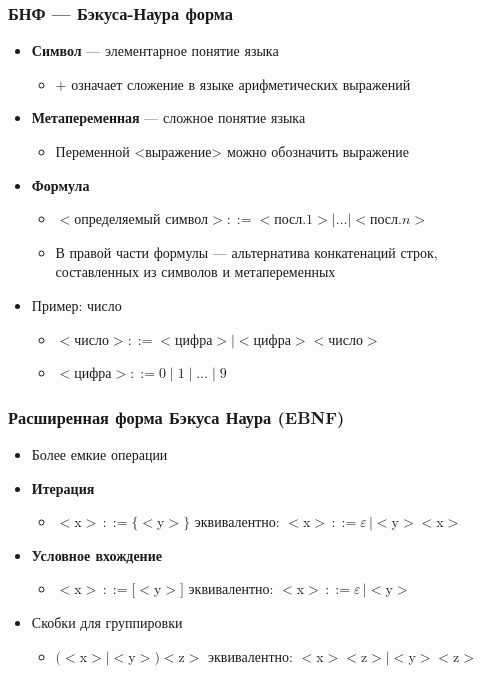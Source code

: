 \documentclass{beamer}
\begin{document}
\begin{frame}[fragile]
  \transwipe[direction=90]
  \frametitle{БНФ ---  Бэкуса-Наура форма}
  \begin{itemize}
    \item \textbf{Символ} --- элементарное понятие языка
    \begin{itemize}
      \item $+$ означает сложение в языке арифметических выражений
    \end{itemize}
    \item \textbf{Метапеременная} --- сложное понятие языка
    \begin{itemize}
      \item Переменной <выражение> можно обозначить выражение
    \end{itemize}
    \item \textbf{Формула}
    \begin{itemize}
      \item $<$определяемый символ$> ::= <$посл$.1> | \dots | <$посл$.n>$
      \item В правой части формулы --- альтернатива конкатенаций строк, составленных из символов и метапеременных
    \end{itemize}
    \item Пример: число
    \begin{itemize}
      \item $<$число$> ::= <$цифра$> \mid <$цифра$><$число$>$
      \item $<$цифра$> ::= 0 \mid 1 \mid \dots \mid 9 $
    \end{itemize}
  \end{itemize}
\end{frame}

 \begin{frame}[fragile]
   \transwipe[direction=90]
   \frametitle{Расширенная форма Бэкуса Наура (EBNF)}
   \begin{itemize}
     \item Более емкие операции
      \item \textbf{Итерация}
      \begin{itemize}
        \item $<$x$> \, ::= \{ <$y$> \}$ эквивалентно: $<$x$> \, ::= \varepsilon \, | <$y$><$x$>$
      \end{itemize}
      \item \textbf{Условное вхождение}
      \begin{itemize}
        \item $<$x$> \, ::= [ <$y$> ]$ эквивалентно: $<$x$> \, ::= \varepsilon \, | <$y$>$
      \end{itemize}
      \item Скобки для группировки
      \begin{itemize}
        \item $(<$x$> \mid <$y$>) <$z$>$ эквивалентно: $<$x$><$z$> \mid <$y$><$z$>$
      \end{itemize}
  \end{itemize}
\end{frame}
\end{document}
